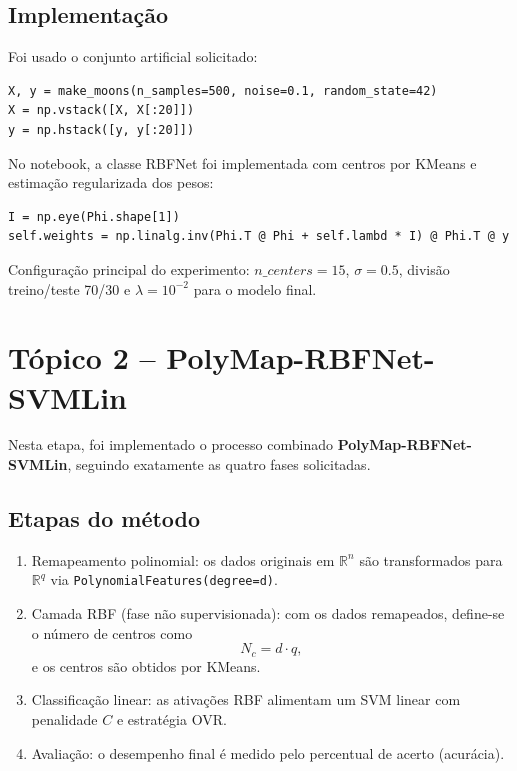 \documentclass[11pt,a4paper]{article}
\begin{document}
\subsection{Implementação}

Foi usado o conjunto artificial solicitado:

\begin{lstlisting}
X, y = make_moons(n_samples=500, noise=0.1, random_state=42)
X = np.vstack([X, X[:20]])
y = np.hstack([y, y[:20]])
\end{lstlisting}

No notebook, a classe RBFNet foi implementada com centros por KMeans e estimação regularizada dos pesos:

\begin{lstlisting}
I = np.eye(Phi.shape[1])
self.weights = np.linalg.inv(Phi.T @ Phi + self.lambd * I) @ Phi.T @ y
\end{lstlisting}

Configuração principal do experimento: $n\_centers = 15$, $\sigma = 0.5$, divisão treino/teste 70/30 e $\lambda = 10^{-2}$ para o modelo final.

\section{Tópico 2 -- PolyMap-RBFNet-SVMLin}

Nesta etapa, foi implementado o processo combinado \textbf{PolyMap-RBFNet-SVMLin}, seguindo exatamente as quatro fases solicitadas.

\subsection{Etapas do método}

\begin{enumerate}
\item Remapeamento polinomial: os dados originais em $\mathbb{R}^n$ são transformados para $\mathbb{R}^q$ via \texttt{PolynomialFeatures(degree=d)}.
\item Camada RBF (fase não supervisionada): com os dados remapeados, define-se o número de centros como
\begin{equation}
N_c = d \cdot q,
\end{equation}
e os centros são obtidos por KMeans.
\item Classificação linear: as ativações RBF alimentam um SVM linear com penalidade $C$ e estratégia OVR.
\item Avaliação: o desempenho final é medido pelo percentual de acerto (acurácia).
\end{enumerate}
\end{document}
